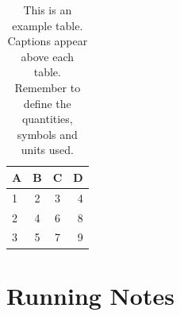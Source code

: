 \documentclass[fleqn,usenatbib]{mnras}
\begin{document}
\begin{table}
	\centering
	\caption{This is an example table. Captions appear above each table.
	Remember to define the quantities, symbols and units used.}
	\label{tab:example_table}
	\begin{tabular}{lccr} %
		\hline
		A & B & C & D\\
		\hline
		1 & 2 & 3 & 4\\
		2 & 4 & 6 & 8\\
		3 & 5 & 7 & 9\\
		\hline
	\end{tabular}
\end{table}

\section{Running Notes} \label{sec:running_notes}

\label{lastpage}
\end{document}
